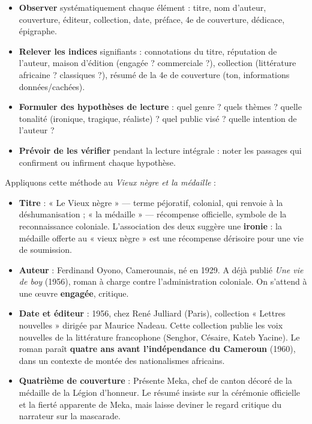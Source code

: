 \documentclass[11pt]{article}
\begin{document}
\begin{methode}
\begin{itemize}
\item \textbf{Observer} systématiquement chaque élément : titre, nom d'auteur, couverture, éditeur, collection, date, préface, 4e de couverture, dédicace, épigraphe.
\item \textbf{Relever les indices} signifiants : connotations du titre, réputation de l'auteur, maison d'édition (engagée ? commerciale ?), collection (littérature africaine ? classiques ?), résumé de la 4e de couverture (ton, informations données/cachées).
\item \textbf{Formuler des hypothèses de lecture} : quel genre ? quels thèmes ? quelle tonalité (ironique, tragique, réaliste) ? quel public visé ? quelle intention de l'auteur ?
\item \textbf{Prévoir de les vérifier} pendant la lecture intégrale : noter les passages qui confirment ou infirment chaque hypothèse.
\end{itemize}
\end{methode}

Appliquons cette méthode au \emph{Vieux nègre et la médaille} :

\begin{itemize}
\item \textbf{Titre} : « Le Vieux nègre » — terme péjoratif, colonial, qui renvoie à la déshumanisation ; « la médaille » — récompense officielle, symbole de la reconnaissance coloniale. L'association des deux suggère une \textbf{ironie} : la médaille offerte au « vieux nègre » est une récompense dérisoire pour une vie de soumission.
\item \textbf{Auteur} : Ferdinand Oyono, Camerounais, né en 1929. A déjà publié \emph{Une vie de boy} (1956), roman à charge contre l'administration coloniale. On s'attend à une œuvre \textbf{engagée}, critique.
\item \textbf{Date et éditeur} : 1956, chez René Julliard (Paris), collection « Lettres nouvelles » dirigée par Maurice Nadeau. Cette collection publie les voix nouvelles de la littérature francophone (Senghor, Césaire, Kateb Yacine). Le roman paraît \textbf{quatre ans avant l'indépendance du Cameroun} (1960), dans un contexte de montée des nationalismes africains.
\item \textbf{Quatrième de couverture} : Présente Meka, chef de canton décoré de la médaille de la Légion d'honneur. Le résumé insiste sur la cérémonie officielle et la fierté apparente de Meka, mais laisse deviner le regard critique du narrateur sur la mascarade.
\end{itemize}
\end{document}
